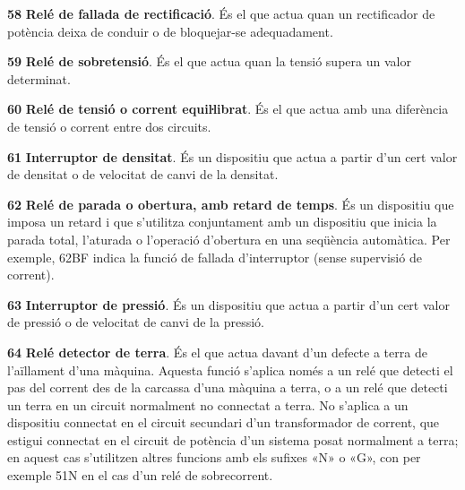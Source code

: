 \begin{multicols}{2}
\begin{list}{}
\item[\textbf{58}]   
\textbf{Relé de fallada de rectificació}. És el que actua quan un rectificador de potència deixa de conduir o de bloquejar-se adequadament.

\item[\textbf{59}]   
\textbf{Relé de sobretensió}. És el que
actua quan la tensió supera un valor determinat.

\item[\textbf{60}]   
\textbf{Relé de tensió o corrent equiŀlibrat}. És el que actua amb una diferència de tensió o
corrent entre dos circuits.

\item[\textbf{61}] 
 \textbf{Interruptor de densitat}. És un dispositiu que actua a partir d'un cert valor de densitat o de velocitat de canvi de la densitat.


\item[\textbf{62}]   
\textbf{Relé de
parada o obertura, amb retard de temps}. És un dispositiu que imposa un retard i que s'utilitza
conjuntament amb un dispositiu que inicia la parada total, l'aturada o l'operació
d'obertura en una seqüència automàtica. Per exemple, 62BF indica la funció de fallada d'interruptor (sense supervisió de corrent).

\item[\textbf{63}]   
\textbf{Interruptor de pressió}. És un dispositiu que actua a partir d'un cert valor de pressió o de velocitat de canvi de la pressió.

\item[\textbf{64}]    
\textbf{Relé detector de terra}.
És el que actua davant d'un defecte a terra de l'aïllament d'una
màquina. Aquesta funció s'aplica només a un relé que detecti el pas
del corrent des de la carcassa  d'una màquina a terra, o a un relé
que detecti un terra en un circuit normalment no connectat a terra. No
 s'aplica a un dispositiu connectat en el circuit secundari d'un
transformador de corrent, que estigui connectat en el circuit de
potència d'un sistema posat normalment a terra; en aquest cas s'utilitzen altres funcions amb els sufixes «N» o «G», con  per exemple 51N en el cas d'un relé de sobrecorrent.


\end{list}
\end{multicols}
